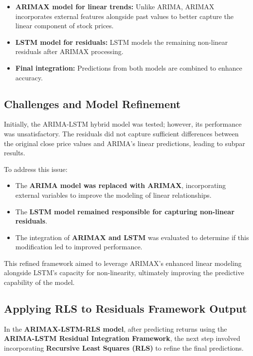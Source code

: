 \begin{itemize}
    \item \textbf{ARIMAX model for linear trends:} Unlike ARIMA, ARIMAX incorporates external features alongside past values to better capture the linear component of stock prices.
    \item \textbf{LSTM model for residuals:} LSTM models the remaining non-linear residuals after ARIMAX processing.
    \item \textbf{Final integration:} Predictions from both models are combined to enhance accuracy.
\end{itemize}

\subsection{Challenges and Model Refinement}

Initially, the ARIMA-LSTM hybrid model was tested; however, its performance was unsatisfactory. The residuals did not capture sufficient differences between the original close price values and ARIMA’s linear predictions, leading to subpar results. 

To address this issue:
\begin{itemize}
    \item The \textbf{ARIMA model was replaced with ARIMAX}, incorporating external variables to improve the modeling of linear relationships.
    \item The \textbf{LSTM model remained responsible for capturing non-linear residuals}.
    \item The integration of \textbf{ARIMAX and LSTM} was evaluated to determine if this modification led to improved performance.
\end{itemize}

This refined framework aimed to leverage ARIMAX's enhanced linear modeling alongside LSTM's capacity for non-linearity, ultimately improving the predictive capability of the model.

\subsection{Applying RLS to Residuals Framework Output}

In the \textbf{ARIMAX-LSTM-RLS model}, after predicting returns using the \textbf{ARIMA-LSTM Residual Integration Framework}, the next step involved incorporating \textbf{Recursive Least Squares (RLS)} to refine the final predictions.

